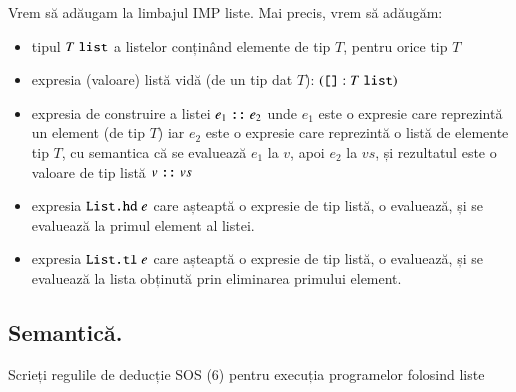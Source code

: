 \documentclass[addpoints,12pt,a4paper,answers]{exam}
\newcommand{\getHeight}[1]{%
}
\newenvironment{solutie}{\par\hspace*{-9em}\begin{minipage}{.98\paperwidth}
\hrulefill {\bf Rezolvare} \hrulefill}{\hrulefill\end{minipage}}
\begin{document}
\begin{questions}
{}
Vrem să adăugam la limbajul IMP liste.  Mai precis, vrem să adăugăm:
\begin{itemize}
\item tipul $T \mathrel{\text{\ttfamily list}}$ a listelor conținând elemente de tip $T$, pentru orice tip $T$
\item expresia (valoare) listă vidă (de un tip dat $T$): $({\mathrel{\text{\ttfamily []}}} : T \mathrel{\text{\ttfamily list}})$
\item expresia de construire a listei $e_1 \mathrel{\text{\ttfamily ::}} e_2$ unde $e_1$ este o expresie care reprezintă un element (de tip $T$) iar $e_2$ este o expresie care reprezintă o listă de elemente tip $T$, cu semantica că se evaluează $e_1$ la $v$, apoi $e_2$ la $vs$, și rezultatul este o valoare de tip listă $v \mathrel{\text{\ttfamily ::}} vs$
\item expresia $\mathrel{\text{\ttfamily List.hd}} e$ care așteaptă o expresie de tip listă, o evaluează, și se evaluează la primul element al listei.
\item expresia $\mathrel{\text{\ttfamily List.tl}} e$ care așteaptă o expresie de tip listă, o evaluează, și se evaluează la lista obținută prin eliminarea primului element.
\end{itemize}
\begin{parts}
\part[1\half] {\bf Semantică. } Scrieți regulile de deducție SOS (6) pentru execuția programelor folosind liste 
\getHeight{
\begin{solutie}
(0,25p/regulă)


\end{solutie}}
\end{parts}
\end{questions}
\end{document}
